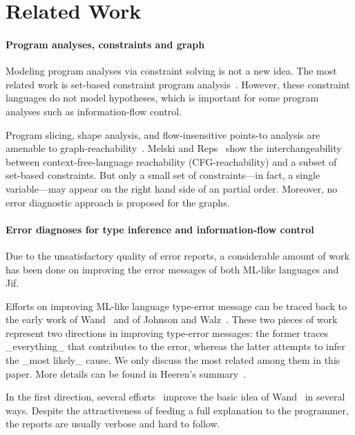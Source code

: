 \section{Related Work}

\paragraph{Program analyses, constraints and graph} 

Modeling program analyses via constraint solving is not a new idea.
The most related work is set-based constraint program
analysis~\cite{aiken-setconstraint, aiken-typeinclusion}.  However,
these constraint languages do not model hypotheses, which is important
for some program analyses such as information-flow control.
 
Program slicing, shape analysis, and flow-insensitive points-to
analysis are amenable to graph-reachability~\cite{reps-graph}. Melski
and Reps~\cite{melski-cflgraph} show the interchangeability between
context-free-language reachability (CFG-reachability) and a subset of
set-based constraints. But only a small set of constraints---in fact,
a single variable---may appear on the right hand side of an partial
order. Moreover, no error diagnostic approach is proposed for the
graphs.

\paragraph{Error diagnoses for type inference
	    and information-flow control} 

Due to the unsatisfactory quality of error reports, a considerable
amount of work has been done on improving the error messages of both
ML-like languages and Jif.

Efforts on improving ML-like language type-error message can be
traced back to the early work of Wand~\cite{wand-errorfinding} and
of Johnson and Walz~\cite{johnson-popl86}. These two pieces of work
represent two directions in improving type-error messages: the former
traces _everything_ that contributes to the error, whereas the
latter attempts to infer the _most likely_ cause. We only discuss the
most related among them in this paper. More details can be found in
Heeren's summary~\cite{heeren:thesis}.

In the first direction, several efforts~\cite{choppella95,
haack:slicing, tip:slicing} improve the basic idea of
Wand~\cite{wand-errorfinding} in several ways. Despite the
attractiveness of feeding a full explanation to the programmer, the
reports are usually verbose and hard to follow.

